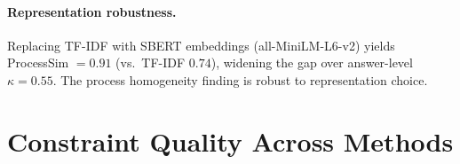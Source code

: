 \begin{table}[h]
\centering
\small
\caption{Cross-model process-level independence on FOLIO ($n = 204$, $K = 12$). Mean Cosine: mean pairwise TF-IDF cosine similarity of reasoning traces (Eq.~\ref{eq:process-sim}). Answer $\kappa$: per-question answer agreement. Gap: Cosine $-$ $\kappa$. $r$: Pearson correlation between ProcessSim and answer agreement. Conv.: fraction of process-convergent but answer-divergent trace pairs. {*}{*}\,$p < 0.01$; {*}{*}{*}\,$p < 0.001$.}
\label{tab:cross-model-process}
\end{table}

\paragraph{Representation robustness.} Replacing TF-IDF with SBERT embeddings (all-MiniLM-L6-v2) yields ProcessSim $= 0.91$ (vs.\ TF-IDF $0.74$), widening the gap over answer-level $\kappa = 0.55$. The process homogeneity finding is robust to representation choice.

\section{Constraint Quality Across Methods}
\label{app:constraint-quality}

